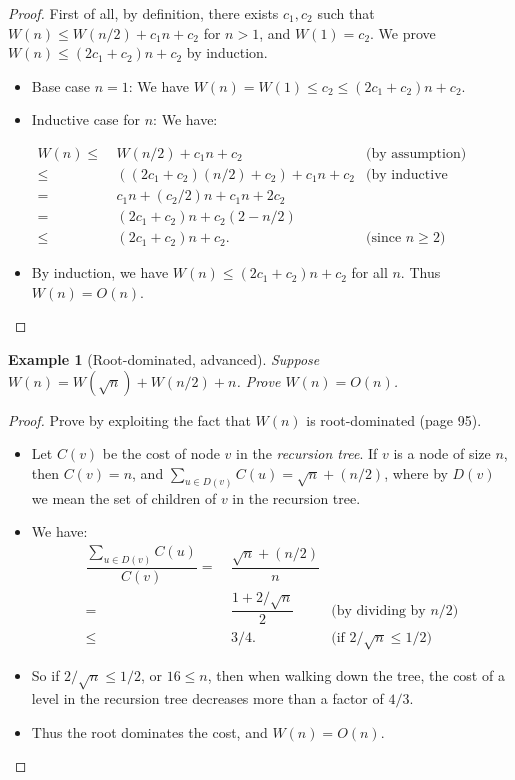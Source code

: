 \documentclass[11pt,a4paper,oneside,microtype,chapter,nokorean]{oblivoir}
\newtheorem{example}{Example}
\begin{document}
\begin{proof}
  First of all, by definition, there exists $c_1,c_2$ such that $W(n) \le W(n/2) + c_1 n + c_2$ for
  $n > 1$, and $W(1) = c_2$.  We prove $W(n) \le (2 c_1 + c_2) n + c_2$ by induction.

  \begin{itemize}
  \item Base case $n=1$: We have $W(n) = W(1) \le c_2 \le (2 c_1 + c_2) n + c_2$.

  \item Inductive case for $n$: We have:

    \begin{align*}
      W(n)
      \le &~ W(n/2) + c_1 n + c_2 & \mbox{(by assumption)} \\
      \le &~ ((2 c_1 + c_2) (n/2) + c_2) + c_1 n + c_2 & \mbox{(by inductive hypothesis)} \\
      = &~ c_1 n + (c_2 / 2) n + c_1 n + 2 c_2 \\
      = &~ (2 c_1 + c_2)n + c_2 (2 - n/2) \\
      \le &~ (2 c_1 + c_2)n + c_2. & \mbox{(since $n \ge 2$)}
    \end{align*}

  \item By induction, we have $W(n) \le (2 c_1 + c_2) n + c_2$ for all $n$.  Thus $W(n) = O(n)$.
  \end{itemize}
\end{proof}

\begin{example}[Root-dominated, advanced] Suppose $W(n) = W(\sqrt{n}) + W(n/2) + n$.  Prove
  $W(n) = O(n)$.
\end{example}


\begin{proof}
  Prove by exploiting the fact that $W(n)$ is root-dominated (page 95).

  \begin{itemize}
  \item Let $C(v)$ be the cost of node $v$ in the \emph{recursion tree}.  If $v$ is a node of size
    $n$, then $C(v) = n$, and $\sum_{u \in D(v)} C(u) = \sqrt{n} + (n/2)$, where by $D(v)$ we mean
    the set of children of $v$ in the recursion tree.
  \item We have:
    \begin{align*}
      \dfrac{\sum_{u \in D(v)} C(u)}{C(v)}
      = &~ \dfrac{\sqrt{n} + (n/2)}{n} \\
      = &~ \dfrac{1 + 2/\sqrt{n}}{2} & \mbox{(by dividing by $n/2$)} \\
      \le &~ 3/4. & \mbox{(if $2/\sqrt{n} \le 1/2$)}
    \end{align*}
  \item So if $2/\sqrt{n} \le 1/2$, or $16 \le n$, then when walking down the tree, the cost of a
    level in the recursion tree decreases more than a factor of $4/3$.
  \item Thus the root dominates the cost, and $W(n) = O(n)$.
  \end{itemize}
\end{proof}
\end{document}
